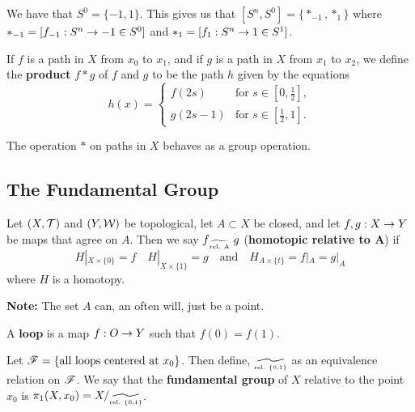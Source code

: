 We have that $S^0 = \{-1,1\}$. This gives us that $[S^n, S^0] = \{*_{-1}, *_{1}\}$ where $*_{-1} = [f_{-1}:S^n \rightarrow -1\in S^0]$ and $*_{1} = [f_{1}:S^n\rightarrow 1\in S^1]$.

\vs

\dfn If $f$ is a path in $X$ from $x_0$ to $x_1$, and if $g$ is a path in $X$ from $x_1$ to $x_2$, we define the \textbf{product} $f*g$ of $f$ and $g$ to be the path $h$ given by the equations
\[h(x) = \begin{cases} f(2s) & \text{for } s\in [0,\frac{1}{2}],\\ g(2s - 1) & \text{for }s\in [\frac{1}{2}, 1].\end{cases}\]

\vs

\begin{thm}
The operation $*$ on paths in $X$ behaves as a group operation.
\end{thm}





\subsection{The Fundamental Group}\nl
\setcounter{section}{52}
\setcounter{thm}{0}


\dfn Let $(X, \mathcal{T})$ and $(Y, \mathcal{W})$ be topological, let $A\subset X$ be closed, and let $f,g:X\rightarrow Y$ be maps that agree on $A$. Then we say $f{\lower 4.5pt \hbox{$\widetilde{\text{\tiny rel. A}}$}}\ g$ (\textbf{homotopic relative to $\boldsymbol A$}) if
\[H|_{X\times \{0\}} = f\quad H|_{X\times \{1\}} = g\quad \text{and}\quad H_{A\times\{t\}} = f|_A = g|_A\]
where $H$ is a homotopy.

\textbf{Note:} The set $A$ can, an often will, just be a point.

\dfn A \textbf{loop} is a map $f:O\rightarrow Y$ such that $f(0) = f(1)$.

\vs

\dfn Let $\mathscr{F} = \{\text{all loops centered at }x_0\}$. Then define, ${\lower 4.5pt \hbox{$\widetilde{\text{\tiny rel. \{0,1\}}}$}}$ as an equivalence relation on $\mathscr{F}$. We say that the \textbf{fundamental group} of $X$ relative to the point $x_0$ is $\pi_1(X, x_0) = X/{\lower 4.5pt \hbox{$\widetilde{\text{\tiny rel. \{0,1\}}}$}}$.

\vs

